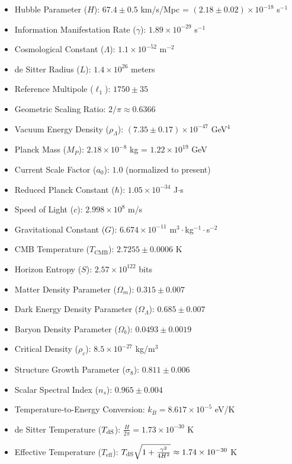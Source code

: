 \documentclass[11pt,english,twoside]{article}
\theoremstyle{plain}
\theoremstyle{definition}
\theoremstyle{remark}
\newcommand{\dS}{{\rm dS}}
\newcommand{\gammaR}{\gamma}
\begin{document}
\begin{itemize}
\item Hubble Parameter ($H$): $67.4 \pm 0.5$ km/s/Mpc = $(2.18 \pm 0.02) \times 10^{-18}$ s$^{-1}$
\item Information Manifestation Rate ($\gammaR$): $1.89 \times 10^{-29}$ s$^{-1}$
\item Cosmological Constant ($\Lambda$): $1.1 \times 10^{-52}$ m$^{-2}$
\item de Sitter Radius ($L$): $1.4 \times 10^{26}$ meters
\item Reference Multipole ($\ell_1$): $1750 \pm 35$
\item Geometric Scaling Ratio: $2/\pi \approx 0.6366$
\item Vacuum Energy Density ($\rho_\Lambda$): $(7.35 \pm 0.17) \times 10^{-47}$ GeV$^4$
\item Planck Mass ($M_P$): $2.18 \times 10^{-8}$ kg = $1.22 \times 10^{19}$ GeV
\item Current Scale Factor ($a_0$): $1.0$ (normalized to present)
\item Reduced Planck Constant ($\hbar$): $1.05 \times 10^{-34}$ J$\cdot$s
\item Speed of Light ($c$): $2.998 \times 10^8$ m/s
\item Gravitational Constant ($G$): $6.674 \times 10^{-11}$ m$^3\cdot$kg$^{-1}\cdot$s$^{-2}$
\item CMB Temperature ($T_{\text{CMB}}$): $2.7255 \pm 0.0006$ K
\item Horizon Entropy ($S$): $2.57 \times 10^{122}$ bits
\item Matter Density Parameter ($\Omega_m$): $0.315 \pm 0.007$
\item Dark Energy Density Parameter ($\Omega_\Lambda$): $0.685 \pm 0.007$
\item Baryon Density Parameter ($\Omega_b$): $0.0493 \pm 0.0019$
\item Critical Density ($\rho_c$): $8.5 \times 10^{-27}$ kg/m$^3$
\item Structure Growth Parameter ($\sigma_8$): $0.811 \pm 0.006$
\item Scalar Spectral Index ($n_s$): $0.965 \pm 0.004$
\item Temperature-to-Energy Conversion: $k_B = 8.617 \times 10^{-5}$ eV/K
\item de Sitter Temperature ($T_{\dS}$): $\frac{H}{2\pi} = 1.73 \times 10^{-30}$ K
\item Effective Temperature ($T_{\text{eff}}$): $T_{\dS}\sqrt{1 + \frac{\gammaR^2}{4H^2}} \approx 1.74 \times 10^{-30}$ K

\end{itemize}
\end{document}
